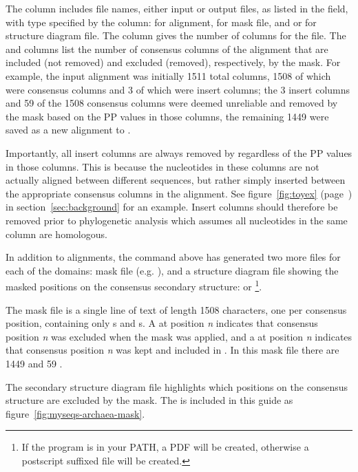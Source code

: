 The  column includes file names, either input or
output files, as listed in the  field, with type
specified by the  column:  for alignment,
 for mask file, and  or  for structure
diagram file. The  column gives the number of columns for the
file. The  and  columns list the number of consensus
columns of the alignment that are included (not removed) and excluded
(removed), respectively, by the mask. For example, the
 input alignment was initially 1511 total
columns, 1508 of which were consensus columns and 3 of which were insert
columns; the 3 insert columns and 59 of the 1508 consensus columns
were deemed unreliable and removed by the mask based on the PP values
in those columns, the remaining 1449 were saved as a new alignment to
.

Importantly, all insert columns are always removed by 
regardless of the PP values in those columns. This is because the
nucleotides in these columns are not actually aligned between
different sequences, but rather simply inserted between the
appropriate consensus columns in the alignment. 
See figure~\ref{fig:toyex} (page~\pageref{fig:toyex}) in
section~\ref{sec:background} for an example. Insert columns should
therefore be removed prior to phylogenetic analysis which assumes
all nucleotides in the same column are homologous. 

In addition to alignments, the command above has generated two more files
for each of the domains: 
mask file (e.g. ), and a structure diagram file
showing the masked positions on the consensus secondary structure:
 or
 \footnote{If the program  is
    in your PATH, a PDF will be created, otherwise a postscript
     suffixed file will be created.}.

The mask file is a single line of text of length 1508 characters, one per
consensus position, containing only s and s. 
A  at position \emph{n} indicates that consensus position \emph{n}
was excluded when the mask was applied, and a  at position
\emph{n} indicates that consensus position \emph{n} was kept and
included in . In this mask file there are
1449  and 59 .

The secondary structure diagram file highlights which positions on the
consensus structure are excluded by the mask. The
 is included in this guide
as figure~\ref{fig:myseqs-archaea-mask}.

